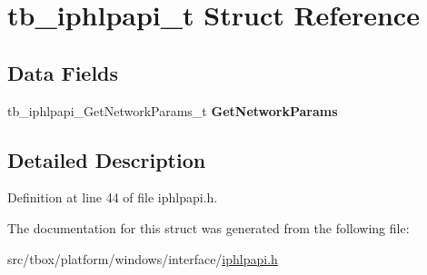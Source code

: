 \hypertarget{structtb__iphlpapi__t}{\section{tb\-\_\-iphlpapi\-\_\-t Struct Reference}
\label{structtb__iphlpapi__t}
}
\subsection*{Data Fields}
\begin{DoxyCompactItemize}
\item 
\hypertarget{structtb__iphlpapi__t_ae6e0d6049fa9f321204e7f6e88601114}{tb\-\_\-iphlpapi\-\_\-\-Get\-Network\-Params\-\_\-t {\bfseries Get\-Network\-Params}}\label{structtb__iphlpapi__t_ae6e0d6049fa9f321204e7f6e88601114}

\end{DoxyCompactItemize}


\subsection{Detailed Description}


Definition at line 44 of file iphlpapi.\-h.



The documentation for this struct was generated from the following file\-:\begin{DoxyCompactItemize}
\item 
src/tbox/platform/windows/interface/\hyperlink{iphlpapi_8h}{iphlpapi.\-h}\end{DoxyCompactItemize}
